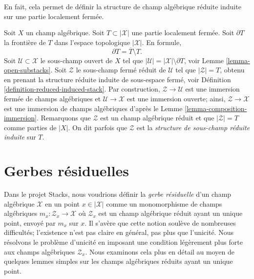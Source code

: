 \noindent
En fait, cela permet de définir la structure de champ algébrique réduite
induite sur une partie localement fermée.

\begin{remark}
\label{remark-stack-structure-locally-closed-subset}
Soit $X$ un champ algébrique.
Soit $T \subset |\mathcal{X}|$ une partie localement fermée.
Soit $\partial T$ la frontière de $T$ dans
l'espace topologique $|\mathcal{X}|$. En formule,
$$
\partial T = \overline{T} \setminus T.
$$
Soit $\mathcal{U} \subset \mathcal{X}$ le sous-champ ouvert de $X$ tel que
$|\mathcal{U}| = |\mathcal{X}| \setminus \partial T$, voir
Lemme \ref{lemma-open-substacks}.
Soit $\mathcal{Z}$ le sous-champ fermé réduit de $\mathcal{U}$ tel que
$|\mathcal{Z}| = T$, obtenu en prenant la structure réduite induite
de sous-espace fermé, voir
Définition \ref{definition-reduced-induced-stack}.
Par construction, $\mathcal{Z} \to \mathcal{U}$ est une immersion fermée de
champs algébriques et $\mathcal{U} \to \mathcal{X}$ est une immersion ouverte;
ainsi, $\mathcal{Z} \to \mathcal{X}$ est une immersion de champs algébriques d'après le
Lemme \ref{lemma-composition-immersion}.
Remarquons que $\mathcal{Z}$ est un champ algébrique réduit et que
$|\mathcal{Z}| = T$ comme parties de $|X|$. On dit parfois que
$\mathcal{Z}$ est la {\it structure de sous-champ réduite induite} sur $T$.
\end{remark}













\section{Gerbes résiduelles}
\label{section-residual-gerbe}

\noindent
Dans le projet Stacks, nous voudrions définir la {\it gerbe résiduelle}
d'un champ algébrique $\mathcal{X}$ en un point $x \in |\mathcal{X}|$
comme un monomorphisme de champs algébriques
$m_x : \mathcal{Z}_x \to \mathcal{X}$ où $\mathcal{Z}_x$ est un champ
algébrique réduit ayant un unique point, envoyé par $m_x$ sur $x$.
Il s'avère que cette notion soulève de nombreuses difficultés; l'existence n'est pas
claire en général, pas plus que l'unicité.
Nous résolvons le problème d'unicité en imposant une condition légèrement plus forte
aux champs algébriques $\mathcal{Z}_x$.
Nous examinons cela plus en détail au moyen de quelques lemmes simples
sur les champs algébriques réduits ayant un unique point.

